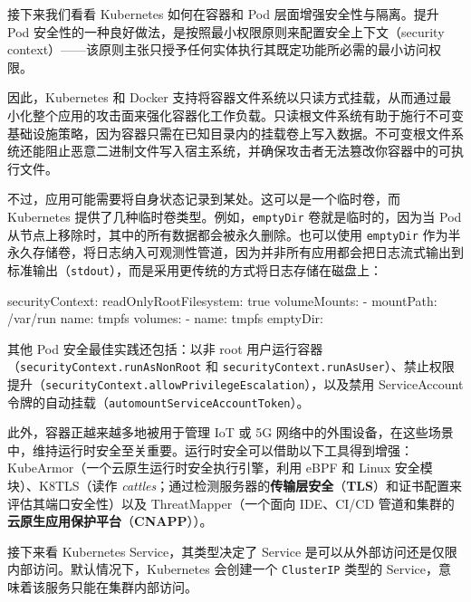接下来我们看看 Kubernetes 如何在容器和 Pod 层面增强安全性与隔离。提升 Pod 安全性的一种良好做法，是按照最小权限原则来配置安全上下文（security context）——该原则主张只授予任何实体执行其既定功能所必需的最小访问权限。

因此，Kubernetes 和 Docker 支持将容器文件系统以只读方式挂载，从而通过最小化整个应用的攻击面来强化容器化工作负载。只读根文件系统有助于施行不可变基础设施策略，因为容器只需在已知目录内的挂载卷上写入数据。不可变根文件系统还能阻止恶意二进制文件写入宿主系统，并确保攻击者无法篡改你容器中的可执行文件。

\label{idx:1978}
不过，应用可能需要将自身状态记录到某处。这可以是一个临时卷，而 Kubernetes 提供了几种临时卷类型。例如，\texttt{emptyDir} 卷就是临时的，因为当 Pod 从节点上移除时，其中的所有数据都会被永久删除。也可以使用 \texttt{emptyDir} 作为半永久存储卷，将日志纳入可观测性管道，因为并非所有应用都会把日志流式输出到标准输出（\texttt{stdout}），而是采用更传统的方式将日志存储在磁盘上：

\begin{codebox}[yaml]
   securityContext:
      readOnlyRootFilesystem: true
    volumeMounts:
      - mountPath: /var/run
        name: tmpfs
volumes:
  - name: tmpfs
    emptyDir: {}
\end{codebox}

其他 Pod 安全最佳实践还包括：以非 root 用户运行容器（\texttt{security\allowbreak{}Context.\allowbreak{}run\allowbreak{}As\allowbreak{}Non\allowbreak{}Root} 和 \texttt{security\allowbreak{}Context.\allowbreak{}run\allowbreak{}As\allowbreak{}User}）、禁止权限提升（\texttt{security\allowbreak{}Context.\allowbreak{}allow\allowbreak{}Privilege\allowbreak{}Escalation}），以及禁用 ServiceAccount 令牌的自动挂载（\texttt{automount\allowbreak{}Service\allowbreak{}Account\allowbreak{}Token}）。

\label{idx:1979}
此外，容器正越来越多地被用于管理 IoT 或 5G 网络中的外围设备，在这些场景中，维持运行时安全至关重要。运行时安全可以借助以下工具得到增强：KubeArmor（一个云原生运行时安全执行引擎，利用 eBPF 和 Linux 安全模块）、K8TLS（读作 \emph{cattles}；通过检测服务器的\textbf{传输层安全}（\textbf{TLS}）和证书配置来评估其端口安全性）以及 ThreatMapper（一个面向 IDE、CI/CD 管道和集群的\textbf{云原生应用保护平台}（\textbf{CNAPP}））。

\label{idx:1980}
接下来看 Kubernetes Service，其类型决定了 Service 是可以从外部访问还是仅限内部访问。默认情况下，Kubernetes 会创建一个 \texttt{ClusterIP} 类型的 Service，意味着该服务只能在集群内部访问。


